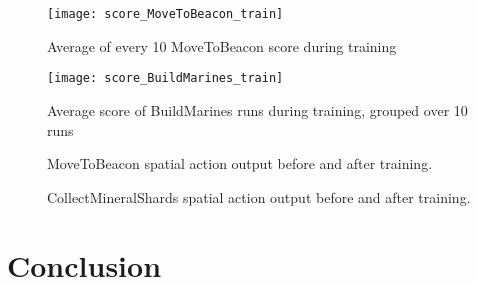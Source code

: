 \begin{figure}[h]
  \centering
  \begin{minipage}[b]{0.45\textwidth}
    \texttt{[image: score\_MoveToBeacon\_train]}
    \caption{Average of every 10 MoveToBeacon score during training}%
    \label{fig:dqn-scores-1}%
  \end{minipage}
  \hfill
  \begin{minipage}[b]{0.45\textwidth}
    \texttt{[image: score\_BuildMarines\_train]}
    \caption{Average score of BuildMarines runs during training, grouped over 10
    runs}%
    \label{fig:dqn-scores-2}
  \end{minipage}
\end{figure}

\begin{figure}[h]
    \centering
    \caption{MoveToBeacon spatial action output before and after training.}%
    \label{fig:cnn-filter1}%
\end{figure}

\begin{figure}[h]
    \centering
    \caption{CollectMineralShards spatial action output before and after training.}%
    \label{fig:cnn-filter2}%
\end{figure}

\section{Conclusion}
